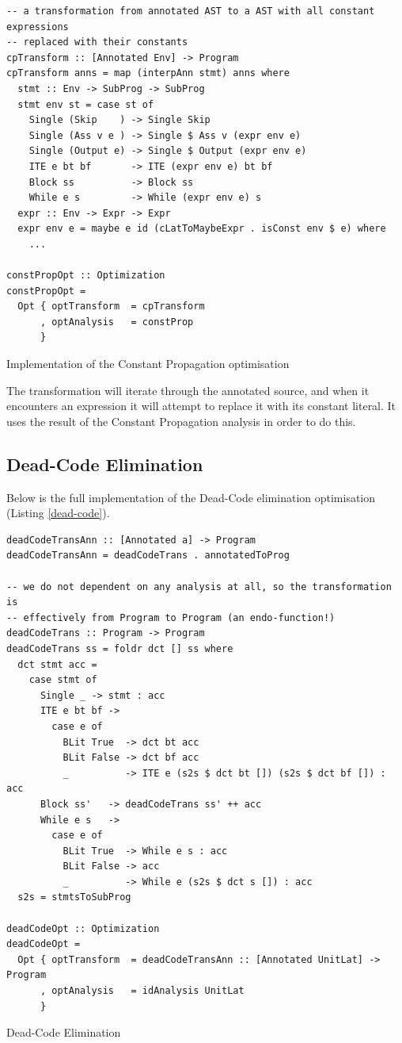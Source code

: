 \documentclass{article}
\begin{document}
\begin{listing}[H]
\begin{verbatim}
-- a transformation from annotated AST to a AST with all constant expressions
-- replaced with their constants
cpTransform :: [Annotated Env] -> Program
cpTransform anns = map (interpAnn stmt) anns where
  stmt :: Env -> SubProg -> SubProg
  stmt env st = case st of
    Single (Skip    ) -> Single Skip
    Single (Ass v e ) -> Single $ Ass v (expr env e)
    Single (Output e) -> Single $ Output (expr env e)
    ITE e bt bf       -> ITE (expr env e) bt bf
    Block ss          -> Block ss
    While e s         -> While (expr env e) s
  expr :: Env -> Expr -> Expr
  expr env e = maybe e id (cLatToMaybeExpr . isConst env $ e) where
    ...

constPropOpt :: Optimization
constPropOpt =
  Opt { optTransform  = cpTransform
      , optAnalysis   = constProp
      }
\end{verbatim}
\caption{Implementation of the Constant Propagation optimisation}
\label{cp-opt-impl}
\end{listing}
The transformation will iterate through the annotated source, and when
it encounters an expression it will attempt to replace it with its
constant literal. It uses the result of the Constant Propagation analysis in
order to do this.

\subsection{Dead-Code Elimination}\label{dead-code-elimination}

Below is the full implementation of the Dead-Code elimination
optimisation (Listing \ref{dead-code}).

\begin{listing}[H]
\begin{verbatim}
deadCodeTransAnn :: [Annotated a] -> Program
deadCodeTransAnn = deadCodeTrans . annotatedToProg

-- we do not dependent on any analysis at all, so the transformation is
-- effectively from Program to Program (an endo-function!)
deadCodeTrans :: Program -> Program
deadCodeTrans ss = foldr dct [] ss where
  dct stmt acc =
    case stmt of
      Single _ -> stmt : acc
      ITE e bt bf ->
        case e of
          BLit True  -> dct bt acc
          BLit False -> dct bf acc
          _          -> ITE e (s2s $ dct bt []) (s2s $ dct bf []) : acc
      Block ss'   -> deadCodeTrans ss' ++ acc
      While e s   ->
        case e of
          BLit True  -> While e s : acc
          BLit False -> acc
          _          -> While e (s2s $ dct s []) : acc
  s2s = stmtsToSubProg

deadCodeOpt :: Optimization
deadCodeOpt =
  Opt { optTransform  = deadCodeTransAnn :: [Annotated UnitLat] -> Program
      , optAnalysis   = idAnalysis UnitLat
      }
\end{verbatim}
\caption{Dead-Code Elimination}
\label{dead-code}
\end{listing}
\end{document}

